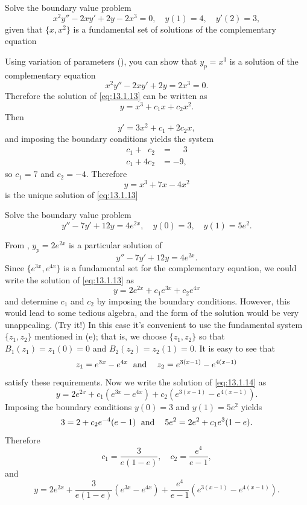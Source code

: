 \begin{example}\label{example:13.1.4}
Solve the boundary value problem
\begin{equation} \label{eq:13.1.13}
x^{2}y''-2xy'+2y-2x^{3}=0,\quad y(1)=4,\quad y'(2)=3,
\end{equation}
given that $\{x,x^{2}\}$ is a fundamental set of solutions
of the complementary equation
\end{example}

\begin{solution}
Using variation of parameters (), you can show
that
$y_{p}=x^{3}$ is a solution of the complementary equation
\[
x^{2}y''-2xy'+2y=2x^{3}=0.
\]
Therefore the solution of
\eqref{eq:13.1.13} can be written as
\[
y=x^{3}+c_{1}x+c_{2}x^{2}.
\]
Then
\[
y'=3x^{2}+c_{1}+2c_{2}x,
\]
and imposing the boundary conditions yields the system
\begin{align*}
c_{1}+\phantom{4}c_{2}&=\phantom{-}3\\
c_{1}+4c_{2}&=-9,
\end{align*}
so $c_{1}=7$ and $c_{2}=-4$.
Therefore
\[
y=x^{3}+7x-4x^{2}
\]
is the unique solution of \eqref{eq:13.1.13}
\end{solution}

\begin{example}\label{example:13.1.5}
Solve the boundary value problem
\[
y''-7y'+12y=4e^{2x},\quad y(0)=3,\quad y(1)=5e^{2}.
\]
\end{example}

\begin{solution}
From , $y_{p}=2e^{2x}$ is a particular solution
of
\begin{equation} \label{eq:13.1.14}
y''-7y'+12y=4e^{2x}.
\end{equation}
Since $\{e^{3x},e^{4x}\}$ is a fundamental set for the complementary
equation, we could write the solution of \eqref{eq:13.1.13} as
\[
y=2e^{2x}+c_{1}e^{3x}+c_{2}e^{4x}
\]
and determine $c_{1}$ and $c_{2}$ by imposing the boundary conditions.
However, this would lead to some tedious algebra, and the form of the
solution would be very unappealing. (Try it!) In this case it's convenient
to use the fundamental system $\{z_{1},z_{2}\}$ mentioned in
(e); that is, we choose
$\{z_{1},z_{2}\}$ so that $B_{1}(z_{1})=z_{1}(0)=0$ and
$B_{2}(z_{2})=z_{2}(1)=0$. It is easy to see that
\[
z_{1}=e^{3x}-e^{4x}\text{\;    and\; \;  }z_{2}=e^{3(x-1)}-e^{4(x-1)}
\]
satisfy these requirements.
Now we write the solution of \eqref{eq:13.1.14} as
\[
y=2e^{2x}+c_{1}\left(e^{3x}-e^{4x}\right)+c_{2}\left(e^{3(x-1)}-e^{4(x-1)}\right).
\]
Imposing the boundary conditions $y(0)=3$  and $y(1)=5e^{2}$ yields
\[
3=2+c_{2}e^{-4}(e-1)\text{\;    and\; \;  }
5e^{2}=2e^{2}+c_{1}e^{3}(1-e).
\]
Therefore
\[
c_{1}=\frac{3}{e(1-e)},\quad c_{2}=\frac{e^{4}}{e-1},
\]
and
\[
y=2e^{2x}+\frac{3}{e(1-e)}(e^{3x}-e^{4x})+
\frac{e^{4}}{e-1}(e^{3(x-1)}-e^{4(x-1)}).
\]
\end{solution}

